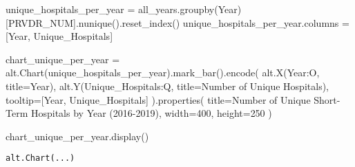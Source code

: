 \documentclass[
  letterpaper,
  DIV=11,
  numbers=noendperiod]{scrartcl}
\newenvironment{Shaded}{\begin{snugshade}}{\end{snugshade}}
\newcommand{\DecValTok}[1]{\textcolor[rgb]{0.68,0.00,0.00}{#1}}
\newcommand{\NormalTok}[1]{\textcolor[rgb]{0.00,0.23,0.31}{#1}}
\newcommand{\OperatorTok}[1]{\textcolor[rgb]{0.37,0.37,0.37}{#1}}
\newcommand{\StringTok}[1]{\textcolor[rgb]{0.13,0.47,0.30}{#1}}
\begin{document}
\begin{Shaded}
\begin{Highlighting}[]
\NormalTok{unique\_hospitals\_per\_year }\OperatorTok{=}\NormalTok{ all\_years.groupby(}\StringTok{\textquotesingle{}Year\textquotesingle{}}\NormalTok{)[}\StringTok{\textquotesingle{}PRVDR\_NUM\textquotesingle{}}\NormalTok{].nunique().reset\_index()}
\NormalTok{unique\_hospitals\_per\_year.columns }\OperatorTok{=}\NormalTok{ [}\StringTok{\textquotesingle{}Year\textquotesingle{}}\NormalTok{, }\StringTok{\textquotesingle{}Unique\_Hospitals\textquotesingle{}}\NormalTok{]}

\NormalTok{chart\_unique\_per\_year }\OperatorTok{=}\NormalTok{ alt.Chart(unique\_hospitals\_per\_year).mark\_bar().encode(}
\NormalTok{    alt.X(}\StringTok{\textquotesingle{}Year:O\textquotesingle{}}\NormalTok{, title}\OperatorTok{=}\StringTok{\textquotesingle{}Year\textquotesingle{}}\NormalTok{),}
\NormalTok{    alt.Y(}\StringTok{\textquotesingle{}Unique\_Hospitals:Q\textquotesingle{}}\NormalTok{, title}\OperatorTok{=}\StringTok{\textquotesingle{}Number of Unique Hospitals\textquotesingle{}}\NormalTok{),}
\NormalTok{    tooltip}\OperatorTok{=}\NormalTok{[}\StringTok{\textquotesingle{}Year\textquotesingle{}}\NormalTok{, }\StringTok{\textquotesingle{}Unique\_Hospitals\textquotesingle{}}\NormalTok{]}
\NormalTok{).properties(}
\NormalTok{    title}\OperatorTok{=}\StringTok{\textquotesingle{}Number of Unique Short{-}Term Hospitals by Year (2016{-}2019)\textquotesingle{}}\NormalTok{,}
\NormalTok{    width}\OperatorTok{=}\DecValTok{400}\NormalTok{,}
\NormalTok{    height}\OperatorTok{=}\DecValTok{250}
\NormalTok{)}

\NormalTok{chart\_unique\_per\_year.display()}
\end{Highlighting}
\end{Shaded}

\begin{verbatim}
alt.Chart(...)
\end{verbatim}
\end{document}
